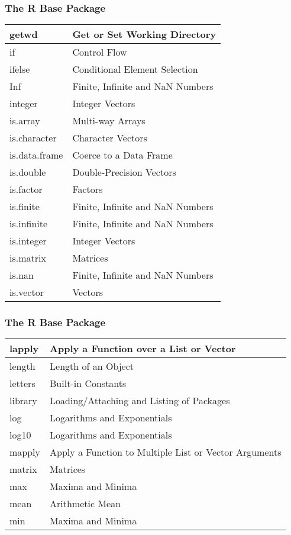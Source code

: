 \documentclass{beamer}
\begin{document}
\begin{frame}
    \frametitle{The R Base Package} 

{\scriptsize
\begin{center}
\begin{tabular}{|l|l|}
 \hline
getwd  &		Get or Set Working Directory \\ \hline
if  &		Control Flow \\ \hline
ifelse	  &	 Conditional Element Selection \\ \hline
Inf  &		Finite, Infinite and NaN Numbers \\ \hline
integer  &		Integer Vectors \\ \hline
is.array  &		Multi-way Arrays \\ \hline
is.character  &		Character Vectors \\ \hline
is.data.frame  &		Coerce to a Data Frame \\ \hline
is.double  &		Double-Precision Vectors \\ \hline
is.factor  &		Factors \\ \hline
is.finite  &		Finite, Infinite and NaN Numbers \\ \hline
is.infinite  &		Finite, Infinite and NaN Numbers \\ \hline
is.integer  &		Integer Vectors \\ \hline
is.matrix  &		Matrices \\ \hline
is.nan  &		Finite, Infinite and NaN Numbers \\ \hline
is.vector  &		Vectors \\ \hline
\end{tabular}
\end{center}
}

\end{frame}


\begin{frame}
    \frametitle{The R Base Package} 

{\scriptsize
\begin{center}
\begin{tabular}{|l|l|}
 \hline
lapply  &	Apply a Function over a List or Vector \\ \hline
length  &	Length of an Object \\ \hline
letters  &	Built-in Constants \\ \hline
library &	Loading/Attaching and Listing of Packages \\ \hline
log & 	Logarithms and Exponentials \\ \hline
log10 &	Logarithms and Exponentials \\ \hline
mapply &	Apply a Function to Multiple List or Vector Arguments \\ \hline
matrix &	Matrices \\ \hline
max	 & Maxima and Minima \\ \hline
mean  &	Arithmetic Mean \\ \hline
min & Maxima and Minima \\ \hline
\end{tabular}
\end{center}
}

\end{frame}
\end{document}
